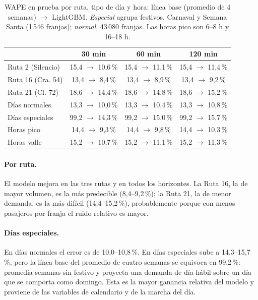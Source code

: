 \documentclass[11pt,a4paper]{article}
\begin{document}
\begin{table}[H]
  \centering
  \caption{WAPE en prueba por ruta, tipo de día y hora: línea base (promedio de 4 semanas) $\rightarrow$ LightGBM. \emph{Especial} agrupa festivos, Carnaval y Semana Santa (1\,546 franjas); \emph{normal}, 43\,080 franjas. Las horas pico son 6--8 h y 16--18 h.}
  \label{tab:desglose}
  \small
  \begin{tabular}{lccc}
    \toprule
     & 30 min & 60 min & 120 min \\
    \midrule
    Ruta 2 (Silencio)  & 15,4 $\rightarrow$ 10,6\,\% & 15,4 $\rightarrow$ 11,1\,\% & 15,4 $\rightarrow$ 11,4\,\% \\
    Ruta 16 (Cra. 54)  & 13,4 $\rightarrow$ 8,4\,\%  & 13,4 $\rightarrow$ 8,9\,\%  & 13,4 $\rightarrow$ 9,2\,\% \\
    Ruta 21 (Cl. 72)   & 18,6 $\rightarrow$ 14,4\,\% & 18,6 $\rightarrow$ 14,8\,\% & 18,6 $\rightarrow$ 15,2\,\% \\
    \midrule
    Días normales      & 13,3 $\rightarrow$ 10,0\,\% & 13,3 $\rightarrow$ 10,4\,\% & 13,3 $\rightarrow$ 10,8\,\% \\
    Días especiales    & 99,2 $\rightarrow$ 14,3\,\% & 99,2 $\rightarrow$ 15,0\,\% & 99,2 $\rightarrow$ 15,7\,\% \\
    \midrule
    Horas pico         & 14,4 $\rightarrow$ 9,3\,\%  & 14,4 $\rightarrow$ 9,8\,\%  & 14,4 $\rightarrow$ 10,3\,\% \\
    Horas valle        & 15,2 $\rightarrow$ 10,7\,\% & 15,2 $\rightarrow$ 11,1\,\% & 15,2 $\rightarrow$ 11,3\,\% \\
    \bottomrule
  \end{tabular}
\end{table}

\paragraph{Por ruta.} El modelo mejora en las tres rutas y en todos los horizontes. La Ruta 16, la de mayor volumen, es la más predecible (8,4--9,2\,\%); la Ruta 21, la de menor demanda, es la más difícil (14,4--15,2\,\%), probablemente porque con menos pasajeros por franja el ruido relativo es mayor.

\paragraph{Días especiales.} En días normales el error es de 10,0--10,8\,\%. En días especiales sube a 14,3--15,7\,\%, pero la línea base del promedio de cuatro semanas se equivoca en 99,2\,\%: promedia semanas sin festivo y proyecta una demanda de día hábil sobre un día que se comporta como domingo. Esta es la mayor ganancia relativa del modelo y proviene de las variables de calendario y de la marcha del día.
\end{document}
